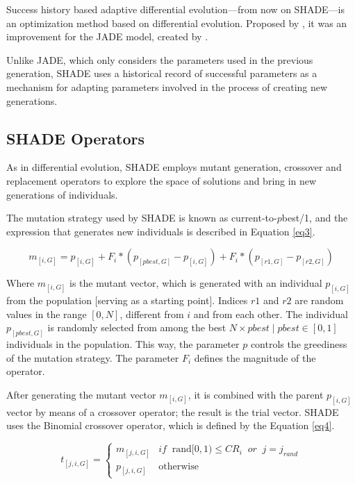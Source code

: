 \documentclass[review]{elsarticle}
\begin{document}
Success history based adaptive differential evolution---from now on SHADE---is an optimization method based on differential evolution. Proposed by \cite{tanabe2013success}, it was an improvement for the JADE model, created by \cite{zhang2009jade}.

Unlike JADE, which only considers the parameters used in the previous generation, SHADE uses a historical record of successful parameters as a mechanism for adapting parameters involved in the process of creating new generations.

\subsection{SHADE Operators}

As in differential evolution, SHADE employs mutant generation, crossover and replacement operators to explore the space of solutions and bring in new generations of individuals.

The mutation strategy used by SHADE is known as current-to-$p$best/1, and the expression that generates new individuals is described in Equation \eqref{eq3}.

\begin{equation}
m_{[i,G]} = p_{[i,G]} + F_i * (p_{[pbest, G]} - p_{[i,G]}) + F_i * (p_{[r1, G]} - p_{[r2,G]})
\label{eq3}
\end{equation}

Where $m_{[i,G]}$ is the mutant vector, which is generated with an individual $p_{[i,G]}$ from the population [serving as a starting point]. Indices $r1$ and $r2$ are random values in the range $[0,N]$, different from $i$ and from each other. The individual $p_{[pbest, G]}$ is randomly selected from among the best $N \times pbest\;|\;pbest\in [0,1]$ individuals in the population. This way, the parameter $p$ controls the greediness of the mutation strategy. The parameter $F_i$ defines the magnitude of the operator.

After generating the mutant vector $m_{[i,G]}$, it is combined with the parent $p_{[i,G]}$ vector by means of a crossover operator; the result is the trial vector. SHADE uses the Binomial crossover operator, which is defined by the Equation \eqref{eq4}.

\begin{equation}
t_{[j,i,G]} = \left\{ \begin{array}{lc}
m_{[j,i,G]} &   if \;\; \text{rand}[0,1) \le CR_i \;\; or \;\;j = j_{rand} \\
p_{[j,i,G]} &  \text{otherwise}
\end{array}
\right.
\label{eq4}
\end{equation}
\end{document}
